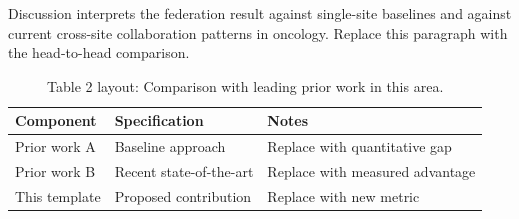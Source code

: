 
Discussion interprets the federation result against single-site baselines and against current cross-site collaboration patterns in oncology. Replace this paragraph with the head-to-head comparison.

\begin{table}[H]
\caption{Table 2 layout: Comparison with leading prior work in this area.}
\label{tab:discussion_compare}
\centering
\begin{tabular}{>{\raggedright\arraybackslash}p{3.4cm} >{\raggedright\arraybackslash}p{4.6cm} >{\raggedright\arraybackslash}p{5.4cm}}
\toprule
\textbf{Component} & \textbf{Specification} & \textbf{Notes} \\
\midrule
  Prior work A & Baseline approach & Replace with quantitative gap \\
  Prior work B & Recent state-of-the-art & Replace with measured advantage \\
  This template & Proposed contribution & Replace with new metric \\
\bottomrule
\end{tabular}
\end{table}
